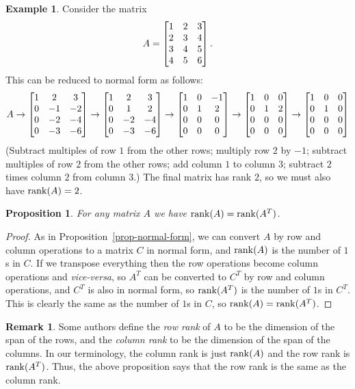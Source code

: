 \documentclass[reqno]{amsart}
\newtheorem{proposition}[theorem]{Proposition}
\theoremstyle{definition}
\newtheorem{remark}[theorem]{Remark}
\newtheorem{example}[theorem]{Example}
\newcommand{\dfn}[1]{\emph{{#1}}\index{#1}}
\begin{document}
\begin{example}\label{eg-normal-form-ii}
 Consider the matrix
 \[ A = \left[\begin{matrix} 1&2&3 \\ 2&3&4 \\ 3&4&5 \\ 4&5&6 \end{matrix}\right] . \]
 This can be reduced to normal form as follows:
 \[ A \to
    \left[\begin{matrix} 1&2&3 \\ 0&-1&-2 \\ 0&-2&-4 \\ 0&-3&-6 \end{matrix}\right] 
    \to
    \left[\begin{matrix} 1&2&3 \\ 0&1&2 \\ 0&-2&-4 \\ 0&-3&-6 \end{matrix}\right] 
    \to
    \left[\begin{matrix} 1&0&-1 \\ 0&1&2 \\ 0&0&0 \\ 0&0&0 \end{matrix}\right]
    \to
    \left[\begin{matrix} 1&0&0 \\ 0&1&2 \\ 0&0&0 \\ 0&0&0 \end{matrix}\right]
    \to
    \left[\begin{matrix} 1&0&0 \\ 0&1&0 \\ 0&0&0 \\ 0&0&0 \end{matrix}\right]
 \]
 (Subtract multiples of row $1$ from the other rows; multiply row $2$
 by $-1$; subtract multiples of row $2$ from the other rows; add column
 $1$ to column $3$; subtract $2$ times column $2$ from column $3$.)
 The final matrix has rank $2$, so we must also have $\operatorname{rank}(A)=2$.
\end{example}

\begin{proposition}\label{prop-equal-rank}
 For any matrix $A$ we have $\operatorname{rank}(A)=\operatorname{rank}(A^T)$.
\end{proposition}
\begin{proof}
 As in Proposition~\ref{prop-normal-form}, we can convert $A$ by row
 and column operations to a matrix $C$ in normal form, and $\operatorname{rank}(A)$
 is the number of $1$s in $C$.  If we transpose everything then the
 row operations become column operations and \emph{vice-versa}, so
 $A^T$ can be converted to $C^T$ by row and column operations, and
 $C^T$ is also in normal form, so $\operatorname{rank}(A^T)$ is the number of $1$s in
 $C^T$.  This is clearly the same as the number of $1$s in $C$, so
 $\operatorname{rank}(A)=\operatorname{rank}(A^T)$.  
\end{proof}

\begin{remark}\label{rem-row-col-rank}
 Some authors define the \dfn{row rank} of $A$ to be the dimension of
 the span of the rows, and the \dfn{column rank} to be the dimension
 of the span of the columns.  In our terminology, the column rank is
 just $\operatorname{rank}(A)$ and the row rank is $\operatorname{rank}(A^T)$.  Thus, the above
 proposition says that the row rank is the same as the column rank.
\end{remark}
\end{document}
